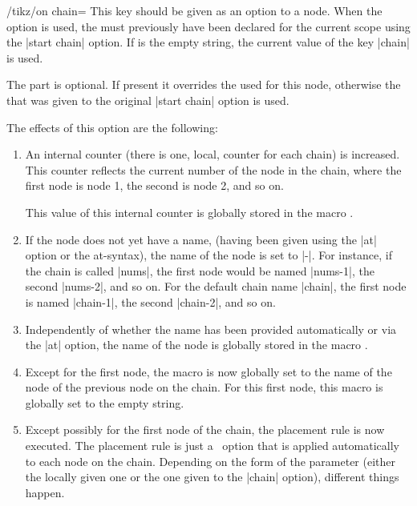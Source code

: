 \begin{key}{/tikz/on chain=}
  This key should be given as an option to a node. When the option is
  used, the  must previously have been declared for
  the current scope using the |start chain| option. If  is
  the empty string, the current value of the key |chain| is used. 

  The  part is optional. If present it overrides the
   used for this node, otherwise the 
  that was given to the original |start chain| option is used.

  The effects of this option are the following:
  \begin{enumerate}
  \item An internal counter (there is one, local, counter
    for each chain) is increased. This counter reflects the current
    number of the node in the chain, where the first node is node 1,
    the second is node 2, and so on.

    This value of this internal counter is globally stored in the
    macro \declare{|\tikzchaincount|}.
  \item If the node does not yet have a name, (having been given using
    the |at| option or the at-syntax), the name of the node is set to
    |-|. For instance, if the chain is called |nums|, the first
    node would be named |nums-1|, the second |nums-2|, and so on. For
    the default chain name |chain|, the first node is named |chain-1|,
    the second |chain-2|, and so on.
  \item Independently of whether the name has been provided
    automatically or via the |at| option, the name of the node is
    globally stored in the macro \declare{|\tikzchaincurrent|}.
  \item Except for the first node, the macro
    \declare{|\tikzchainprevious|} is now globally set to the name of
    the node of the previous node on the chain. For this first node,
    this macro is globally set to the empty string.
  \item Except possibly for the first node of the chain, the placement
    rule is now executed. The placement rule is just a \tikzname\ option
    that is applied automatically to each node on the chain. Depending
    on the form of the  parameter (either the locally
    given one or the one given to the |chain| option), different
    things happen.


\end{enumerate}
\end{key}
